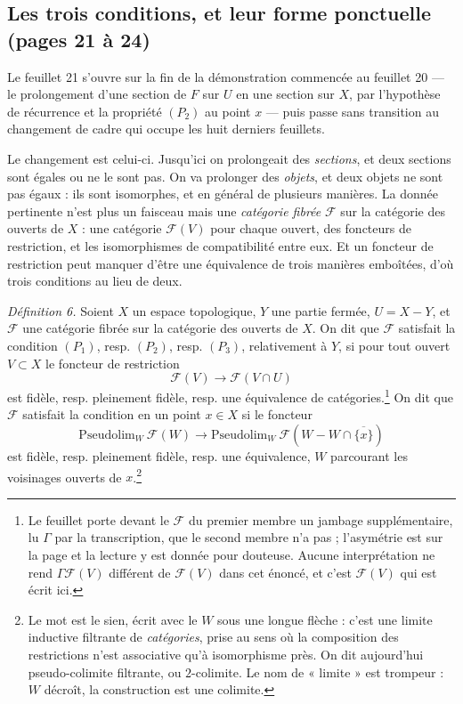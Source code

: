 \documentclass[11pt,a4paper]{article}
\begin{document}
\subsection*{Les trois conditions, et leur forme ponctuelle (pages 21 à 24)}

Le feuillet 21 s'ouvre sur la fin de la démonstration commencée au feuillet 20 —
le prolongement d'une section de $F$ sur $U$ en une section sur $X$, par
l'hypothèse de récurrence et la propriété $(P_{2})$ au point $x$ — puis passe
sans transition au changement de cadre qui occupe les huit derniers feuillets.

Le changement est celui-ci. Jusqu'ici on prolongeait des \emph{sections}, et
deux sections sont égales ou ne le sont pas. On va prolonger des \emph{objets},
et deux objets ne sont pas égaux : ils sont isomorphes, et en général de
plusieurs manières. La donnée pertinente n'est plus un faisceau mais une
\emph{catégorie fibrée} $\mathcal{F}$ sur la catégorie des ouverts de $X$ : une
catégorie $\mathcal{F}(V)$ pour chaque ouvert, des foncteurs de restriction, et
les isomorphismes de compatibilité entre eux. Et un foncteur de restriction peut
manquer d'être une équivalence de trois manières emboîtées, d'où trois
conditions au lieu de deux.

\emph{Définition 6.} Soient $X$ un espace topologique, $Y$ une partie fermée,
$U = X - Y$, et $\mathcal{F}$ une catégorie fibrée sur la catégorie des ouverts
de $X$. On dit que $\mathcal{F}$ satisfait la condition $(P_{1})$, resp.
$(P_{2})$, resp. $(P_{3})$, relativement à $Y$, si pour tout ouvert
$V \subset X$ le foncteur de restriction
\[
  \mathcal{F}(V) \longrightarrow \mathcal{F}(V \cap U)
\]
est fidèle, resp. pleinement fidèle, resp. une équivalence de
catégories.\footnote{Le feuillet porte devant le $\mathcal{F}$ du premier membre
un jambage supplémentaire, lu $\Gamma$ par la transcription, que le second
membre n'a pas ; l'asymétrie est sur la page et la lecture y est donnée pour
douteuse. Aucune interprétation ne rend $\Gamma\mathcal{F}(V)$ différent de
$\mathcal{F}(V)$ dans cet énoncé, et c'est $\mathcal{F}(V)$ qui est écrit ici.}
On dit que $\mathcal{F}$ satisfait la condition en un point $x \in X$ si le
foncteur
\[
  \mathrm{Pseudolim}_{W}\ \mathcal{F}(W)
  \longrightarrow
  \mathrm{Pseudolim}_{W}\ \mathcal{F}(W - W \cap \overline{\{x\}})
\]
est fidèle, resp. pleinement fidèle, resp. une équivalence, $W$ parcourant les
voisinages ouverts de $x$.\footnote{Le mot est le sien, écrit avec le $W$ sous
une longue flèche : c'est une limite inductive filtrante de \emph{catégories},
prise au sens où la composition des restrictions n'est associative qu'à
isomorphisme près. On dit aujourd'hui pseudo-colimite filtrante, ou
$2$-colimite. Le nom de « limite » est trompeur : $W$ décroît, la construction
est une colimite.}
\end{document}
